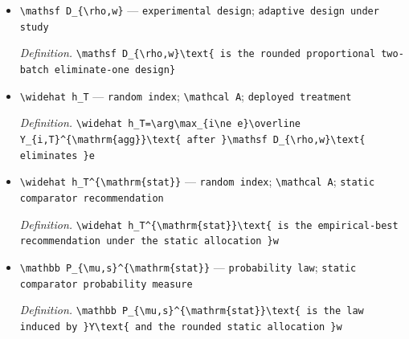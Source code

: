 \documentclass{article}
\begin{document}
\begin{itemize}
  \item \texttt{\textbackslash{}\allowbreak{}mathsf D\_\allowbreak{}\{\textbackslash{}\allowbreak{}rho,\allowbreak{}w\}\allowbreak{}} --- \texttt{experimental design}; \texttt{adaptive design under study}
  \par\smallskip\noindent\emph{Definition.} \texttt{\textbackslash{}\allowbreak{}mathsf D\_\allowbreak{}\{\textbackslash{}\allowbreak{}rho,\allowbreak{}w\}\allowbreak{}\textbackslash{}\allowbreak{}text\{ is the rounded proportional two-\allowbreak{}batch eliminate-\allowbreak{}one design\}\allowbreak{}}
  \item \texttt{\textbackslash{}\allowbreak{}widehat h\_\allowbreak{}T} --- \texttt{random index}; \texttt{\textbackslash{}\allowbreak{}mathcal A}; \texttt{deployed treatment}
  \par\smallskip\noindent\emph{Definition.} \texttt{\textbackslash{}\allowbreak{}widehat h\_\allowbreak{}T=\allowbreak{}\textbackslash{}\allowbreak{}arg\textbackslash{}\allowbreak{}max\_\allowbreak{}\{i\textbackslash{}\allowbreak{}ne e\}\allowbreak{}\textbackslash{}\allowbreak{}overline Y\_\allowbreak{}\{i,\allowbreak{}T\}\allowbreak{}\textasciicircum{}\{\textbackslash{}\allowbreak{}mathrm\{agg\}\allowbreak{}\}\allowbreak{}\textbackslash{}\allowbreak{}text\{ after \}\allowbreak{}\textbackslash{}\allowbreak{}mathsf D\_\allowbreak{}\{\textbackslash{}\allowbreak{}rho,\allowbreak{}w\}\allowbreak{}\textbackslash{}\allowbreak{}text\{ eliminates \}\allowbreak{}e}
  \item \texttt{\textbackslash{}\allowbreak{}widehat h\_\allowbreak{}T\textasciicircum{}\{\textbackslash{}\allowbreak{}mathrm\{stat\}\allowbreak{}\}\allowbreak{}} --- \texttt{random index}; \texttt{\textbackslash{}\allowbreak{}mathcal A}; \texttt{static comparator recommendation}
  \par\smallskip\noindent\emph{Definition.} \texttt{\textbackslash{}\allowbreak{}widehat h\_\allowbreak{}T\textasciicircum{}\{\textbackslash{}\allowbreak{}mathrm\{stat\}\allowbreak{}\}\allowbreak{}\textbackslash{}\allowbreak{}text\{ is the empirical-\allowbreak{}best recommendation under the static allocation \}\allowbreak{}w}
  \item \texttt{\textbackslash{}\allowbreak{}mathbb P\_\allowbreak{}\{\textbackslash{}\allowbreak{}mu,\allowbreak{}s\}\allowbreak{}\textasciicircum{}\{\textbackslash{}\allowbreak{}mathrm\{stat\}\allowbreak{}\}\allowbreak{}} --- \texttt{probability law}; \texttt{static comparator probability measure}
  \par\smallskip\noindent\emph{Definition.} \texttt{\textbackslash{}\allowbreak{}mathbb P\_\allowbreak{}\{\textbackslash{}\allowbreak{}mu,\allowbreak{}s\}\allowbreak{}\textasciicircum{}\{\textbackslash{}\allowbreak{}mathrm\{stat\}\allowbreak{}\}\allowbreak{}\textbackslash{}\allowbreak{}text\{ is the law induced by \}\allowbreak{}Y\textbackslash{}\allowbreak{}text\{ and the rounded static allocation \}\allowbreak{}w}

\end{itemize}
\end{document}
